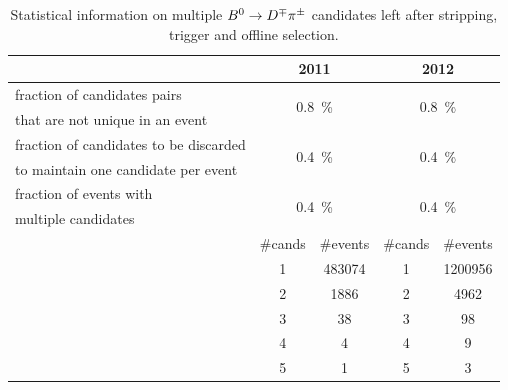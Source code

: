 \begin{table}[!phtb]
\centering
\caption{
Statistical information on multiple $B^0\rightarrow D^\mp\pi^\pm$ candidates left after stripping, trigger and offline selection.}
\begin{tabular}{lcccc}
\toprule
 & \multicolumn{2}{c}{2011} & \multicolumn{2}{c}{2012}\\
\midrule
fraction of candidates pairs & \multicolumn{2}{c}{\multirow{2}[2]{*}{\SI{0.8}{\percent}}} & \multicolumn{2}{c}{\multirow{2}[2]{*}{\SI{0.8}{\percent}}}\\
that are not unique in an event & & & & \\
\midrule
fraction of candidates to be discarded & \multicolumn{2}{c}{\multirow{2}[2]{*}{\SI{0.4}{\percent}}} & \multicolumn{2}{c}{\multirow{2}[2]{*}{\SI{0.4}{\percent}}}\\
to maintain one candidate per event & & & & \\
\midrule
fraction of events with & \multicolumn{2}{c}{\multirow{2}[2]{*}{\SI{0.4}{\percent}}} & \multicolumn{2}{c}{\multirow{2}[2]{*}{\SI{0.4}{\percent}}}\\
multiple candidates & & & & \\
\cmidrule(r){2-5}
 & \#cands & \#events & \#cands & \#events\\
\cmidrule(r){2-5}
 & 1 & 483074 & 1 & 1200956\\
 & 2 & 1886   & 2 & 4962\\
 & 3 & 38     & 3 & 98\\
 & 4 & 4      & 4 & 9\\
 & 5 & 1      & 5 & 3\\
\bottomrule
\end{tabular}
\label{tab:multiaftersel}
\end{table}
